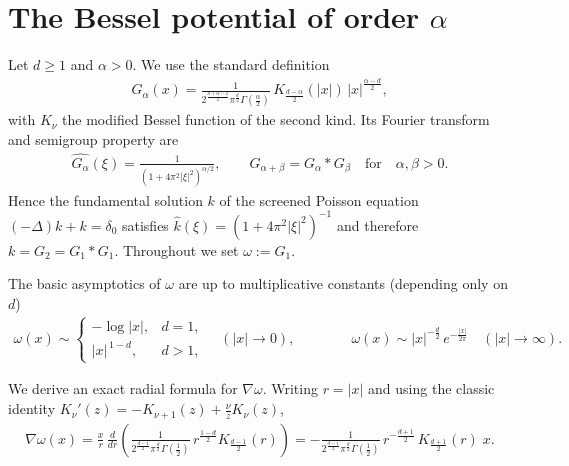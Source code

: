 \documentclass[reqno, 11pt]{amsart}
\numberwithin{equation}{section}
\theoremstyle{definition}
\begin{document}
\appendix


\section{The Bessel potential of order $\alpha$}
\label{app:bessel_pot}

Let $d\ge 1$ and $\alpha>0$. We use the standard definition \cite[Equation (4, 1)]{aronszajn_smith_1961_theory}
\begin{align*}
    G_\alpha(x)
    = \frac{1}{2^{\frac{d+\alpha-2}{2}}\pi^{\frac{d}{2}}\Gamma\!\left(\frac{\alpha}{2}\right)}
    \,K_{\frac{d-\alpha}{2}}\!(|x|)\,|x|^{\frac{\alpha-d}{2}},
\end{align*}
with $K_\nu$ the modified Bessel function of the second kind. Its Fourier transform and semigroup property \cite[Equation (4, 6) and (4, 7)]{aronszajn_smith_1961_theory} are
\begin{align*}
    \widehat{G_\alpha}(\xi)=\frac{1}{(1+4\pi^2|\xi|^2)^{\alpha/2}},
    \qquad
    G_{\alpha+\beta}=G_\alpha\ast G_\beta\quad\text{for}\quad\alpha,\beta>0.
\end{align*}
Hence the fundamental solution $k$ of the screened Poisson equation $(-\Delta)k+k=\delta_0$ satisfies $\hat k(\xi)=(1+4\pi^2|\xi|^2)^{-1}$ and therefore $k=G_2=G_1\ast G_1$. Throughout we set $\omega:=G_1$.

The basic asymptotics of $\omega$ are up to multiplicative constants (depending only on $d$) \cite[Equation (4.2)]{aronszajn_smith_1961_theory}
\begin{align*}
    \omega(x)\sim
    \begin{cases}
        -\log|x|, & d=1,\\
        |x|^{\,1-d}, & d>1,
    \end{cases}
    \quad (|x|\to 0),
    \qquad\qquad
    \omega(x)\sim |x|^{-\frac d2}\,e^{-\frac{|x|}{2\pi}}
    \quad (|x|\to\infty).
\end{align*}

We derive an exact radial formula for $\nabla\omega$. Writing $r=|x|$ and using the classic identity $K_\nu'(z)=-K_{\nu+1}(z)+\frac{\nu}{z}K_\nu(z)$,
\begin{align*}
    \nabla\omega(x)
    = \frac{x}{r}\,\frac{d}{dr}\!\left(\frac{1}{2^{\frac{d-1}{2}}\pi^{\frac{d}{2}}\Gamma\!\left(\frac{1}{2}\right)}\,r^{\frac{1-d}{2}}K_{\frac{d-1}{2}}(r)\right)
    = -\frac{1}{2^{\frac{d-1}{2}}\pi^{\frac{d}{2}}\Gamma\!\left(\frac{1}{2}\right)}\,
    r^{-\frac{d+1}{2}}\,K_{\frac{d+1}{2}}(r)\;x.
\end{align*}
\end{document}
